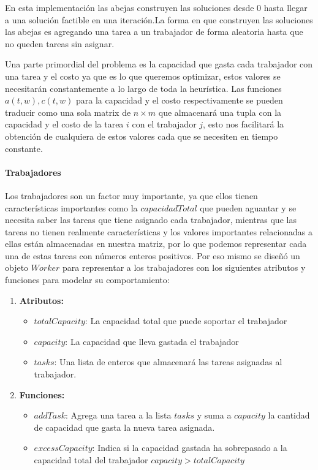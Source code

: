 \documentclass[12pt]{article}
\begin{document}
	En esta implementación las abejas construyen las soluciones desde 0 hasta llegar
	a una solución factible en una iteración.La forma en que construyen las soluciones
	las abejas es agregando una tarea a un trabajador de forma aleatoria hasta que no
	queden tareas sin asignar.
	
	Una parte primordial del problema es la capacidad que gasta cada trabajador con una
	tarea y el costo ya que es lo que queremos optimizar, estos valores se necesitarán
	constantemente a lo largo de toda la heurística.
	Las funciones $a(t,w), c(t,w)$ para la capacidad y el costo respectivamente se 
	pueden traducir como una sola matrix de $n \times m$ que almacenará una tupla con
	la capacidad y el costo de la tarea $i$ con el trabajador $j$, esto nos facilitará
	la obtención de cualquiera de estos valores cada que se necesiten en tiempo 
	constante.
	
	
	\paragraph{Trabajadores}
	
	Los trabajadores son un factor muy importante, ya que ellos tienen
	características importantes como la $capacidadTotal$ que pueden aguantar y 
	se necesita saber las tareas que tiene asignado cada trabajador, 
	mientras que las tareas no tienen realmente características y los valores 
	importantes relacionadas a ellas están almacenadas en nuestra matriz, por lo que 
	podemos	representar cada una de estas tareas con números enteros positivos.
	Por eso mismo se diseñó un objeto $Worker$ para representar a los trabajadores con
	los siguientes atributos y funciones para modelar su comportamiento:
	\begin{enumerate}
		\item \textbf{Atributos:}
		\begin{itemize}
			\item $totalCapacity$: La capacidad total que puede soportar el trabajador
			\item $capacity$: La capacidad que lleva gastada el trabajador
			\item $tasks$: Una lista de enteros que almacenará las tareas asignadas al 
			trabajador.
		\end{itemize}
		\item \textbf{Funciones:}
		\begin{itemize}
			\item $addTask$: Agrega una tarea a la lista $tasks$ y suma a $capacity$
			la cantidad de capacidad que gasta la nueva tarea asignada.
			\item $excessCapacity$: Indica si la capacidad gastada ha sobrepasado 
			a la capacidad total del trabajador $capacity > totalCapacity$
		\end{itemize}
	\end{enumerate}
\end{document}
